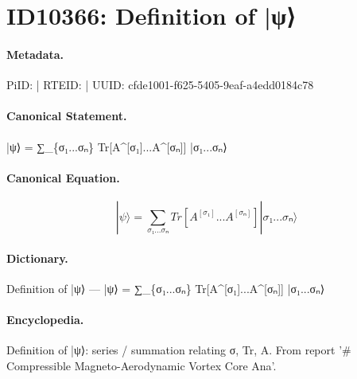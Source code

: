 \section*{ID10366: Definition of |ψ⟩}
\paragraph{Metadata.}
PiID:  | RTEID:  | UUID: cfde1001-f625-5405-9eaf-a4edd0184c78

\paragraph{Canonical Statement.}
|ψ⟩ = ∑\_\{σ₁...σₙ\} Tr[A\textasciicircum{}[σ₁]...A\textasciicircum{}[σₙ]] |σ₁...σₙ⟩

\paragraph{Canonical Equation.}
\[
|ψ⟩ = ∑_{σ₁...σₙ} Tr[A^[σ₁]...A^[σₙ]] |σ₁...σₙ⟩
\]

\paragraph{Dictionary.}
Definition of |ψ⟩ — |ψ⟩ = ∑\_\{σ₁...σₙ\} Tr[A\textasciicircum{}[σ₁]...A\textasciicircum{}[σₙ]] |σ₁...σₙ⟩

\paragraph{Encyclopedia.}
Definition of |ψ⟩: series / summation relating σ, Tr, A. From report '\# Compressible Magneto-Aerodynamic Vortex Core Ana'.
